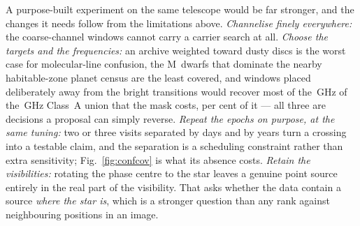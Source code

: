 A purpose-built experiment on the same telescope would be far stronger, and
the changes it needs follow from the limitations above. \emph{Channelise
finely everywhere:} the \NCoarse{} coarse-channel windows cannot carry a
carrier search at all.
\emph{Choose the targets and the frequencies:} an archive weighted toward
dusty discs is the worst case for molecular-line confusion, the M~dwarfs that
dominate the nearby habitable-zone planet census are the least covered, and
windows placed deliberately away from the bright transitions would recover
most of the \MkMaskAGHz\,GHz of the \CvUnionA\,GHz Class~A union that the
mask costs, \MkMaskAPct{} per cent of it --- all three are decisions a
proposal can simply reverse. \emph{Repeat the epochs on purpose, at the same
tuning:} two or three visits separated by days and by years turn a crossing
into a testable claim, and the separation is a scheduling constraint rather
than extra sensitivity; Fig.~\ref{fig:confcov} is what its absence costs.
\emph{Retain the visibilities:} rotating the phase centre to the star leaves a
genuine point source entirely in the real part of the visibility. That asks
whether the data contain a source \emph{where the star is}, which is a
stronger question than any rank
against neighbouring positions in an image.


